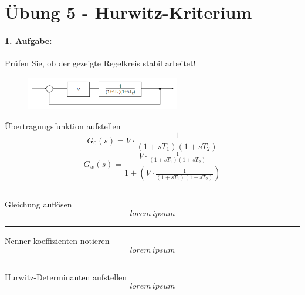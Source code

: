 \documentclass[a4paper, twoside, 11pt]{article}
\begin{document}
\newpage
\section*{\centering Übung 5 - Hurwitz-Kriterium}
\paragraph{1. Aufgabe:} Prüfen Sie, ob der gezeigte Regelkreis stabil arbeitet!
\begin{figure}[H]
	\centering
	\includegraphics[width=0.6\textwidth]{uebung_5_aufgabe_1.png}
\end{figure}
\begin{paracol}{2}
	\vspace{\fill}
	Übertragungsfunktion aufstellen
	\vspace{\fill}
	\switchcolumn
	\begin{equation*}
		G_0(s) = V \cdot \frac{1}{(1+sT_1)(1+sT_2)}
	\end{equation*}
	\begin{equation}
		G_w(s) = \frac{ V \cdot \frac{1}{(1+sT_1)(1+sT_2)}}{1+(V \cdot \frac{1}{(1+sT_1)(1+sT_2)})}
	\end{equation}
\end{paracol}
\hrule
\begin{paracol}{2}
	\vspace{\fill}
	Gleichung auflösen
	\vspace{\fill}
	\switchcolumn
	\begin{equation}
		lorem\, ipsum
	\end{equation}
\end{paracol}
\hrule
\begin{paracol}{2}
	\vspace{\fill}
	Nenner koeffizienten notieren
	\vspace{\fill}
	\switchcolumn
	\begin{equation*}
		lorem\, ipsum
	\end{equation*}
\end{paracol}
\hrule
\begin{paracol}{2}
	\vspace{\fill}
	Hurwitz-Determinanten aufstellen
	\vspace{\fill}
	\switchcolumn
	\begin{equation*}
		lorem\, ipsum
	\end{equation*}
\end{paracol}
\end{document}

